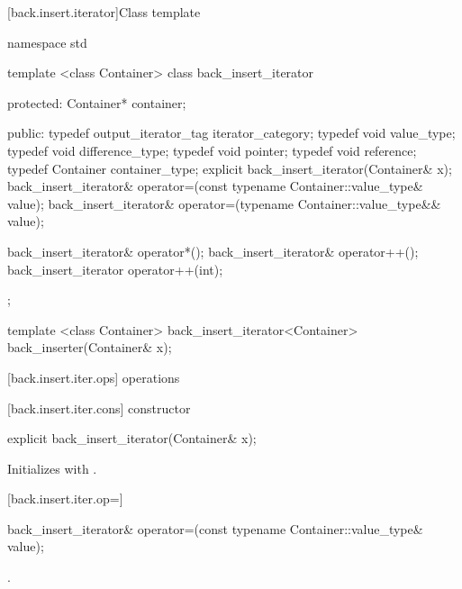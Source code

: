 [back.insert.iterator]{Class template }

%
\begin{codeblock}
namespace std {
  template <class Container>
  class back_insert_iterator {
  protected:
    Container* container;

  public:
    typedef output_iterator_tag iterator_category;
    typedef void value_type;
    typedef void difference_type;
    typedef void pointer;
    typedef void reference;
    typedef Container container_type;
    explicit back_insert_iterator(Container& x);
    back_insert_iterator& operator=(const typename Container::value_type& value);
    back_insert_iterator& operator=(typename Container::value_type&& value);

    back_insert_iterator& operator*();
    back_insert_iterator& operator++();
    back_insert_iterator  operator++(int);
  };

  template <class Container>
    back_insert_iterator<Container> back_inserter(Container& x);
}
\end{codeblock}

[back.insert.iter.ops]{ operations}

[back.insert.iter.cons]{ constructor}

%
\begin{itemdecl}
explicit back_insert_iterator(Container& x);
\end{itemdecl}

\begin{itemdescr}
\pnum
\effects
Initializes
with .
\end{itemdescr}

[back.insert.iter.op=]{}

%
\begin{itemdecl}
back_insert_iterator& operator=(const typename Container::value_type& value);
\end{itemdecl}

\begin{itemdescr}
\pnum
\effects
{}

\pnum
\returns
{}.
\end{itemdescr}

